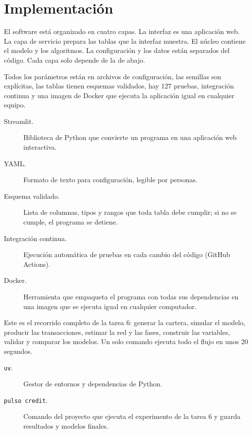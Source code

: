 \section{Implementación}

\begin{decir}
El software está organizado en cuatro capas. La interfaz es una aplicación web. La capa
de servicio prepara las tablas que la interfaz muestra. El núcleo contiene el modelo y los
algoritmos. La configuración y los datos están separados del código. Cada capa solo
depende de la de abajo.

Todos los parámetros están en archivos de configuración, las semillas son explícitas, las
tablas tienen esquemas validados, hay 127 pruebas, integración continua y una imagen de
Docker que ejecuta la aplicación igual en cualquier equipo.
\end{decir}
\begin{terminos}
\begin{description}
\item[Streamlit.] Biblioteca de Python que convierte un programa en una aplicación web
interactiva.
\item[YAML.] Formato de texto para configuración, legible por personas.
\item[Esquema validado.] Lista de columnas, tipos y rangos que toda tabla debe cumplir;
si no se cumple, el programa se detiene.
\item[Integración continua.] Ejecución automática de pruebas en cada cambio del código
(GitHub Actions).
\item[Docker.] Herramienta que empaqueta el programa con todas sus dependencias en una
imagen que se ejecuta igual en cualquier computador.
\end{description}
\end{terminos}

\begin{decir}
Este es el recorrido completo de la tarea 6: generar la cartera, simular el modelo,
producir las transacciones, estimar la red y las fases, construir las variables, validar
y comparar los modelos. Un solo comando ejecuta todo el flujo en unos 20 segundos.
\end{decir}
\begin{terminos}
\begin{description}
\item[\texttt{uv}.] Gestor de entornos y dependencias de Python.
\item[\texttt{pulso credit}.] Comando del proyecto que ejecuta el experimento de la
tarea 6 y guarda resultados y modelos finales.
\end{description}
\end{terminos}

